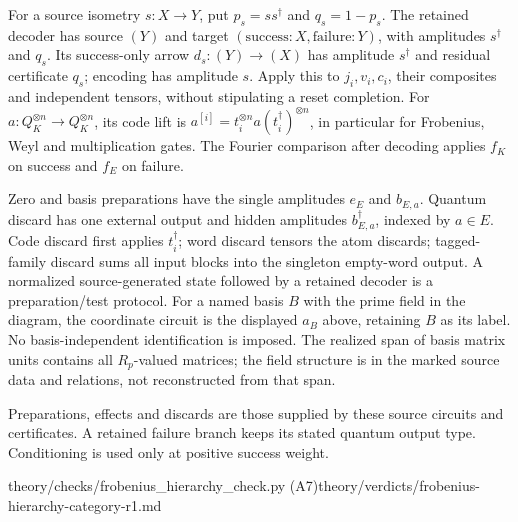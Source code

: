 \begin{definition}
For a source isometry $s:X\to Y$, put $p_s=ss^\dagger$ and $q_s=1-p_s$.
The retained decoder has source $(Y)$ and target
$(\mathrm{success}:X,\mathrm{failure}:Y)$, with amplitudes $s^\dagger$ and
$q_s$. Its success-only arrow $d_s:(Y)\to(X)$ has amplitude $s^\dagger$
and residual certificate $q_s$; encoding has amplitude $s$. Apply this to
$j_i,v_i,c_i$, their composites and independent tensors, without stipulating
a reset completion. For $a:Q_K^{\otimes n}\to Q_K^{\otimes n}$, its code
lift is $a^{[i]}=t_i^{\otimes n}a(t_i^\dagger)^{\otimes n}$, in particular
for Frobenius, Weyl and multiplication gates. The Fourier comparison after
decoding applies $f_K$ on success and $f_E$ on failure.

Zero and basis preparations have the single amplitudes $e_E$ and $b_{E,a}$.
Quantum discard has one external output and hidden amplitudes
$b_{E,a}^\dagger$, indexed by $a\in E$. Code discard first applies
$t_i^\dagger$; word discard tensors the atom discards; tagged-family discard
sums all input blocks into the singleton empty-word output. A normalized
source-generated state followed by a retained decoder is a preparation/test
protocol. For a named basis $B$ with the prime field in the diagram, the
coordinate circuit is the displayed $a_B$ above, retaining $B$ as its label.
No basis-independent identification is imposed. The realized span of basis
matrix units contains all $R_p$-valued matrices; the field structure is in
the marked source data and relations, not reconstructed from that span.
\end{definition}
\begin{scope}
Preparations, effects and discards are those supplied by these source
circuits and certificates. A retained failure branch keeps its stated
quantum output type. Conditioning is used only at positive success weight.
\end{scope}
{theory/checks/frobenius\_hierarchy\_check.py (A7)}{theory/verdicts/frobenius-hierarchy-category-r1.md}

